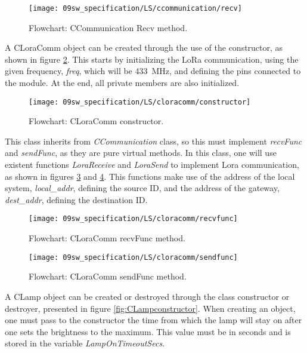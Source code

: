 \begin{figure}[H]
	\centering
	\texttt{[image: 09sw\_specification/LS/ccommunication/recv]}
	\caption{Flowchart: CCommunication Recv method.}
	\label{fig:CCommunicationrecv}
\end{figure}

\clearpage
{}

A CLoraComm object can be created through the use of the constructor, as shown in figure \ref{fig:LoraComm}.
This starts by initializing the LoRa communication, using the given frequency, \textit{freq}, which will be 433~MHz, and defining the pins connected to the module. At the end, all private members are also initialized.

\begin{figure}[H]
	\centering
	\texttt{[image: 09sw\_specification/LS/cloracomm/constructor]}
	\caption{Flowchart: CLoraComm constructor.}
	\label{fig:LoraComm}
\end{figure}

This class inherits from \textit{CCommunication} class, so this must implement \textit{recvFunc} and \textit{sendFunc}, as they are pure virtual methods. In this class, one will use existent functions \textit{LoraReceive} and \textit{LoraSend} to implement Lora communication, as shown in figures \ref{fig:CLoraCommrecvfunc} and \ref{fig:CLoraCommsendfunc}. This functions make use of the address of the local system, \textit{local\_addr}, defining the source ID, and the address of the gateway, \textit{dest\_addr}, defining the destination ID.

\begin{figure}[H]
	\centering		\texttt{[image: 09sw\_specification/LS/cloracomm/recvfunc]}
	\caption{Flowchart: CLoraComm recvFunc method.}
	\label{fig:CLoraCommrecvfunc}
\end{figure}

\begin{figure}[H]
	\centering
	\texttt{[image: 09sw\_specification/LS/cloracomm/sendfunc]}
	\caption{Flowchart: CLoraComm sendFunc method.}
	\label{fig:CLoraCommsendfunc}
\end{figure}


\clearpage
{}

A CLamp object can be created or destroyed through the class constructor or destroyer, presented in figure \ref{fig:CLampconstructor}. When creating an object, one must pass to the constructor the time from which the lamp will stay on after one sets the brightness to the maximum. This value must be in seconds and is stored in the variable \textit{LampOnTimeoutSecs}.

